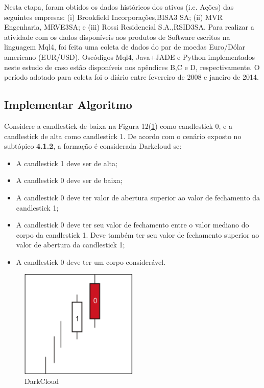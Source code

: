 Nesta etapa, foram obtidos os dados históricos dos ativos (i.e. Ações) das seguintes empresas: (i) Brookfield Incorporações,BISA3 SA; (ii) MVR Engenharia, MRVE3SA; e (iii) Rossi Residencial S.A.,RSID3SA. Para realizar a atividade com os dados disponíveis aos produtos de Software escritos na linguagem Mql4, foi feita uma coleta de dados do par de moedas Euro/Dólar americano (EUR/USD). Oscódigos Mql4, Java+JADE e Python implementados neste estudo de caso estão disponíveis nos apêndices B,C e D, respectivamente. O período adotado para coleta foi o diário entre fevereiro de 2008 e janeiro de 2014.



\subsection{Implementar Algoritmo}

Considere a candlestick de baixa na Figura 12(\ref{f12}) como candlestick 0, e a candlestick de alta como candlestick 1. De acordo com o cenário exposto no subtópico \textbf{4.1.2}, a formação é considerada Darkcloud se:

\begin{itemize}
  \item A candlestick 1 deve ser de alta;
  \item A candlestick 0 deve ser de baixa;
  \item A candlestick 0 deve ter valor de abertura superior ao valor de fechamento da candlestick 1;
  \item A candlestick 0 deve ter seu valor de fechamento entre o valor mediano do corpo da candlestick 1. Deve também ter seu valor de fechamento superior ao valor de abertura da candlestick 1;
  \item A candlestick 0 deve ter um corpo considerável.
\end{itemize}

\begin{figure}[h]
\centering
\label{f12}
\includegraphics[width=0.5\textwidth]{figuras/f12}
\caption{DarkCloud}
\end{figure}

